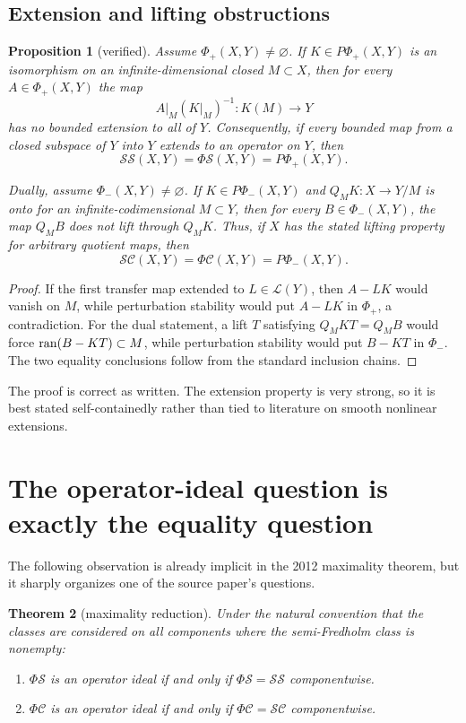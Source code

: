 \documentclass[11pt]{article}
\newtheorem{theorem}{Theorem}[section]
\newtheorem{proposition}[theorem]{Proposition}
\theoremstyle{definition}
\newcommand{\Lop}{\mathcal L}
\newcommand{\SSing}{\mathcal{SS}}
\newcommand{\SCos}{\mathcal{SC}}
\newcommand{\PhiS}{\Phi\mathcal S}
\newcommand{\PhiC}{\Phi\mathcal C}
\newcommand{\PhiP}{\Phi_+}
\newcommand{\PhiM}{\Phi_-}
\newcommand{\PPhiP}{P\Phi_+}
\newcommand{\PPhiM}{P\Phi_-}
\newcommand{\ran}{\mathop{\rm ran}}
\begin{document}
\subsection{Extension and lifting obstructions}

\begin{proposition}[verified]
Assume \(\PhiP(X,Y)\ne\varnothing\).
If \(K\in\PPhiP(X,Y)\) is an isomorphism on an infinite-dimensional closed
\(M\subset X\), then for every \(A\in\PhiP(X,Y)\) the map
\[
 A|_M(K|_M)^{-1}\colon K(M)\longrightarrow Y
\]
has no bounded extension to all of \(Y\).  Consequently, if every bounded map from a
closed subspace of \(Y\) into \(Y\) extends to an operator on \(Y\), then
\[
 \SSing(X,Y)=\PhiS(X,Y)=\PPhiP(X,Y).
\]

Dually, assume \(\PhiM(X,Y)\ne\varnothing\).  If \(K\in\PPhiM(X,Y)\) and
\(Q_MK\colon X\to Y/M\) is onto for an infinite-codimensional \(M\subset Y\), then
for every \(B\in\PhiM(X,Y)\), the map \(Q_MB\) does not lift through \(Q_MK\).
Thus, if \(X\) has the stated lifting property for arbitrary quotient maps, then
\[
 \SCos(X,Y)=\PhiC(X,Y)=\PPhiM(X,Y).
\]
\end{proposition}

\begin{proof}
If the first transfer map extended to \(L\in\Lop(Y)\), then \(A-LK\) would vanish on
\(M\), while perturbation stability would put \(A-LK\) in \(\PhiP\), a contradiction.
For the dual statement, a lift \(T\) satisfying \(Q_MKT=Q_MB\) would force
\(\ran(B-KT)\subset M\), while perturbation stability would put \(B-KT\) in
\(\PhiM\).  The two equality conclusions follow from the standard inclusion chains.
\end{proof}

The proof is correct as written.  The extension property is very strong, so it is best
stated self-containedly rather than tied to literature on smooth nonlinear extensions.

\section{The operator-ideal question is exactly the equality question}

The following observation is already implicit in the 2012 maximality theorem, but it
sharply organizes one of the source paper's questions.

\begin{theorem}[maximality reduction]\label{thm:ideal}
Under the natural convention that the classes are considered on all components where the
semi-Fredholm class is nonempty:
\begin{enumerate}[label=\rm(\roman*)]
\item \(\PhiS\) is an operator ideal if and only if \(\PhiS=\SSing\) componentwise.
\item \(\PhiC\) is an operator ideal if and only if \(\PhiC=\SCos\) componentwise.
\end{enumerate}
\end{theorem}
\end{document}
